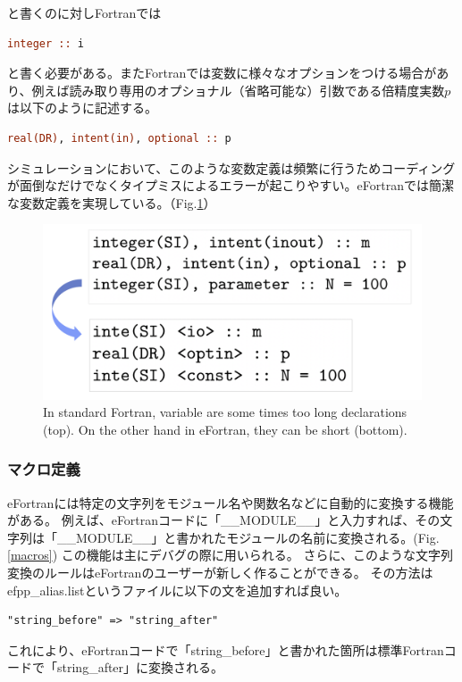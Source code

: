 \documentclass[12pt]{jsarticle}
\begin{document}
\noindent
と書くのに対しFortranでは

\begin{lstlisting}[language=fortran]
integer :: i
\end{lstlisting}

\noindent
と書く必要がある。またFortranでは変数に様々なオプションをつける場合があり、例えば読み取り専用のオプショナル（省略可能な）引数である倍精度実数$p$は以下のように記述する。

\begin{lstlisting}[language=fortran]
real(DR), intent(in), optional :: p
\end{lstlisting}

\noindent
シミュレーションにおいて、このような変数定義は頻繁に行うためコーディングが面倒なだけでなくタイプミスによるエラーが起こりやすい。eFortranでは簡潔な変数定義を実現している。（Fig.\ref{declarations}）

\begin{figure}[H]
\centering
\includegraphics[height=0.5\textheight,width=1.0\hsize,angle=0,keepaspectratio]{./Image/declarations.png}
\caption{In standard Fortran, variable are some times too long declarations (top). On the other hand in eFortran, they can be short (bottom).} \label{declarations}
\end{figure}

\subsubsection{マクロ定義}
eFortranには特定の文字列をモジュール名や関数名などに自動的に変換する機能がある。
例えば、eFortranコードに「\_\_MODULE\_\_」と入力すれば、その文字列は「\_\_MODULE\_\_」と書かれたモジュールの名前に変換される。(Fig.\ref{macros})
この機能は主にデバグの際に用いられる。
さらに、このような文字列変換のルールはeFortranのユーザーが新しく作ることができる。
その方法はefpp\_alias.listというファイルに以下の文を追加すれば良い。
\begin{lstlisting}
"string_before" => "string_after"
\end{lstlisting}
これにより、eFortranコードで「string\_before」と書かれた箇所は標準Fortranコードで「string\_after」に変換される。
\end{document}
